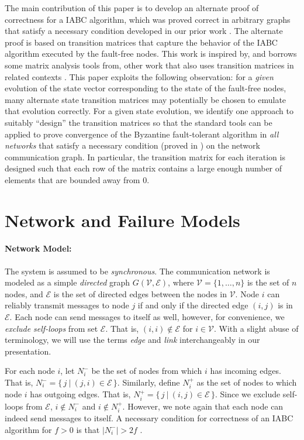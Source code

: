 \documentclass[letterpaper, 12pt]{article}
\newcommand{\scripte}{\mathcal{E}}
\newcommand{\scriptv}{\mathcal{V}}
\begin{document}
The main contribution of this paper is to develop an alternate proof of
correctness for a IABC algorithm, which was proved correct
in arbitrary graphs that satisfy a necessary condition developed
in our prior work \cite{IBA_sync}. 
The alternate proof is based on
transition matrices that capture the behavior of the IABC algorithm
executed by the fault-free nodes.  This work is inspired
by, and borrows some matrix analysis tools from, other work that also uses
transition matrices in 
related contexts \cite{jadbabaie_consensus,Benezit,vaidyaII,Zhang}.
This paper exploits the
following observation: for a {\em given} evolution of the state vector
corresponding to the state of the fault-free nodes, 
many alternate state transition matrices may potentially be chosen to emulate
that evolution correctly. For a given state evolution, we identify one approach
to suitably ``design'' the transition matrices so that the standard tools
can be applied to prove convergence of the Byzantine fault-tolerant
algorithm in {\em all networks} that satisfy a necessary condition
(proved in \cite{us}) on the network communication graph.
In particular, the transition matrix for each iteration
is designed such that each row of the matrix contains a large enough number
of elements that are bounded away from 0.

\section{Network and Failure Models}

\paragraph{Network Model:}
The system is assumed to be {\em synchronous}.
The communication network is modeled as a simple {\em directed} graph $G(\scriptv,\scripte)$, where $\scriptv=\{1,\dots,n\}$ is the set of $n$ nodes, and $\scripte$ is the set of directed edges between the nodes in $\scriptv$. 
 Node $i$ can reliably transmit messages to node $j$ if and only if
the directed edge $(i,j)$ is in $\scripte$.
Each node can send messages to itself as well, however,
for convenience, we {\em exclude self-loops} from set $\scripte$.
That is, $(i,i)\not\in\scripte$ for $i\in\scriptv$.
With a slight abuse of terminology, we will use the terms {\em edge}
and {\em link} interchangeably in our presentation.

For each node $i$, let $N_i^-$ be the set of nodes from which $i$ has incoming
edges.
That is, $N_i^- = \{\, j ~|~ (j,i)\in \scripte\, \}$.
Similarly, define $N_i^+$ as the set of nodes to which node $i$
has outgoing edges. That is, $N_i^+ = \{\, j ~|~ (i,j)\in \scripte\, \}$.
Since we exclude self-loops from $\scripte$,
$i\not\in N_i^-$ and $i\not\in N_i^+$. 
However, we note again that each node can indeed send messages to itself.
A necessary condition for correctness of an IABC algorithm for $f>0$ is that
$|N_i^-|>2f$ \cite{IBA_sync}.
\end{document}
